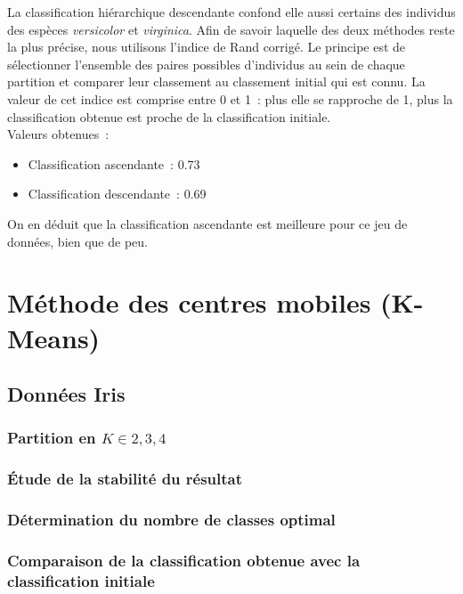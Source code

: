\documentclass[a4paper,10pt]{report}
\begin{document}
La classification hiérarchique descendante confond elle aussi certains des individus des espèces \textit{versicolor} et \textit{virginica}.
Afin de savoir laquelle des deux méthodes reste la plus précise, nous utilisons l'indice de Rand corrigé. Le principe est de sélectionner l'ensemble des paires possibles d'individus au sein de chaque partition et comparer leur classement au classement initial qui est connu. La valeur de cet indice est comprise entre 0 et 1~: plus elle se rapproche de 1, plus la classification obtenue est proche de la classification initiale.\\

Valeurs obtenues~:
\begin{itemize}
	\item Classification ascendante~: 0.73
	\item Classification descendante~: 0.69
\end{itemize}

On en déduit que la classification ascendante est meilleure pour ce jeu de données, bien que de peu.




\chapter{Méthode des centres mobiles (K-Means)}



\section{Données Iris}


\subsection{Partition en $K \in {2,3,4}$}


\subsection{Étude de la stabilité du résultat}


\subsection{Détermination du nombre de classes optimal}


\subsection{Comparaison de la classification obtenue avec la classification initiale}
\end{document}
